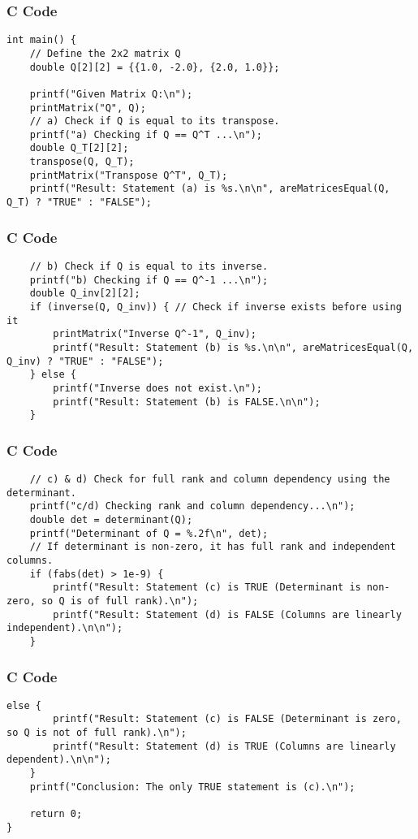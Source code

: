 \documentclass{beamer}
\begin{document}
\begin{frame}[fragile]
\frametitle{C Code}
\begin{lstlisting}
int main() {
    // Define the 2x2 matrix Q
    double Q[2][2] = {{1.0, -2.0}, {2.0, 1.0}};

    printf("Given Matrix Q:\n");
    printMatrix("Q", Q);
    // a) Check if Q is equal to its transpose.
    printf("a) Checking if Q == Q^T ...\n");
    double Q_T[2][2];
    transpose(Q, Q_T);
    printMatrix("Transpose Q^T", Q_T);
    printf("Result: Statement (a) is %s.\n\n", areMatricesEqual(Q, Q_T) ? "TRUE" : "FALSE");
\end{lstlisting}
\end{frame}

\begin{frame}[fragile]
\frametitle{C Code}
\begin{lstlisting}
    // b) Check if Q is equal to its inverse.
    printf("b) Checking if Q == Q^-1 ...\n");
    double Q_inv[2][2];
    if (inverse(Q, Q_inv)) { // Check if inverse exists before using it
        printMatrix("Inverse Q^-1", Q_inv);
        printf("Result: Statement (b) is %s.\n\n", areMatricesEqual(Q, Q_inv) ? "TRUE" : "FALSE");
    } else {
        printf("Inverse does not exist.\n");
        printf("Result: Statement (b) is FALSE.\n\n");
    }
\end{lstlisting}
\end{frame}

\begin{frame}[fragile]
\frametitle{C Code}
\begin{lstlisting}
    // c) & d) Check for full rank and column dependency using the determinant.
    printf("c/d) Checking rank and column dependency...\n");
    double det = determinant(Q);
    printf("Determinant of Q = %.2f\n", det);
    // If determinant is non-zero, it has full rank and independent columns.
    if (fabs(det) > 1e-9) {
        printf("Result: Statement (c) is TRUE (Determinant is non-zero, so Q is of full rank).\n");
        printf("Result: Statement (d) is FALSE (Columns are linearly independent).\n\n");
    } 
\end{lstlisting}
\end{frame}

\begin{frame}[fragile]
\frametitle{C Code}
\begin{lstlisting}
else {
        printf("Result: Statement (c) is FALSE (Determinant is zero, so Q is not of full rank).\n");
        printf("Result: Statement (d) is TRUE (Columns are linearly dependent).\n\n");
    }
    printf("Conclusion: The only TRUE statement is (c).\n");

    return 0;
}
\end{lstlisting}
\end{frame}
\end{document}
